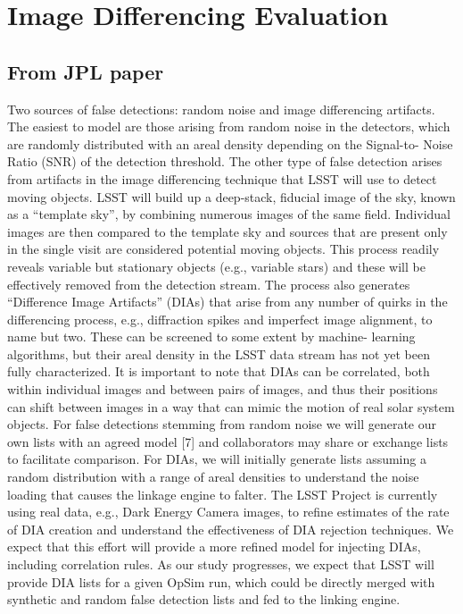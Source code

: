 \section{Image Differencing Evaluation}


\subsection{From JPL paper}

Two sources of false detections: random noise and image differencing artifacts. The easiest to model are those arising from random noise in the detectors, which are randomly distributed with an areal density depending on the Signal-to- Noise Ratio (SNR) of the detection threshold.
The other type of false detection arises from artifacts in the image differencing technique that LSST will use to detect moving objects. LSST will build up a deep-stack, fiducial image of the sky, known as a ``template sky'', by combining numerous images of the same field. Individual images are then compared to the template sky and sources that are present only in the single visit are considered potential moving objects. This process readily reveals variable but stationary objects (e.g., variable stars) and these will be effectively removed from the detection stream. The process also generates ``Difference Image Artifacts'' (DIAs) that arise from any number of quirks in the differencing process, e.g., diffraction spikes and imperfect image alignment, to name but two. These can be screened to some extent by machine- learning algorithms, but their areal density in the LSST data stream has not yet been fully characterized. It is important to note that DIAs can be correlated, both within individual images and between pairs of images, and thus their positions can shift between images in a way that can mimic the motion of real solar system objects.
For false detections stemming from random noise we will generate our own lists with an agreed model [7] and collaborators may share or exchange lists to facilitate comparison. For DIAs, we will initially generate lists assuming a random distribution with a range of areal densities to understand the noise loading that causes the linkage engine to falter. The LSST Project is currently using real data, e.g., Dark Energy Camera images, to refine estimates of the rate of DIA creation and understand the effectiveness of DIA rejection techniques. We expect that this effort will provide a more refined model for injecting DIAs, including correlation rules. As our study progresses, we expect that LSST will provide DIA lists for a given OpSim run, which could be directly merged with synthetic and random false detection lists and fed to the linking engine.



